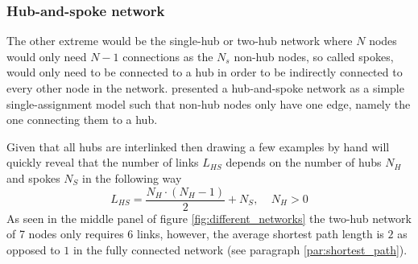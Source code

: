 \subsubsection{Hub-and-spoke network}
The other extreme would be the single-hub or two-hub network where $N$ nodes would only need $N-1$ connections as the $N_s$ non-hub nodes, so called spokes, would only need to be connected to a hub in order to be indirectly connected to every other node in the network. \citet{o1987quadratic} presented a hub-and-spoke network as a simple single-assignment model such that non-hub nodes only have one edge, namely the one connecting them to a hub.
\par
Given that all hubs are interlinked then drawing a few examples by hand will quickly reveal that the number of links $L_{HS}$ depends on the number of hubs $N_H$ and spokes $N_S$ in the following way
\begin{equation*}
  L_{HS}=\frac{N_H\cdot(N_H-1)}{2}+N_S,\ \ \ \ \ N_H>0
\end{equation*}
As seen in the middle panel of figure \ref{fig:different_networks} the two-hub network of 7 nodes only requires 6 links, however, the average shortest path length is $2$ as opposed to $1$ in the fully connected network (see paragraph \ref{par:shortest_path}).

